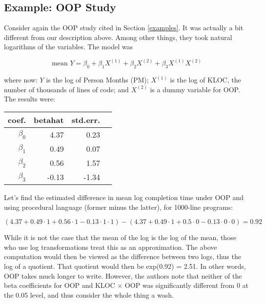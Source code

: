 \subsection{Example:  OOP Study}

Consider again the OOP study cited in Section \ref{examples}.  It was
actually a bit different from our description above.  Among other
things, they took natural logarithms of the variables.  The model was

\begin{equation}
\label{oopmodel}
\textrm{mean } Y =
\beta_0 +
\beta_1 X^{(1)} +
\beta_2 X^{(2)} +
\beta_3 X^{(1)} X^{(2)}
\end{equation}

where now:  $Y$ is the log of Person Months (PM); $X^{(1)}$ is the log of
KLOC, the number of thousands of lines of code; and $ X^{(2)}$ is a dummy
variable for OOP.  The results were:

\begin{tabular}{|r|r|r|r|}
\hline
coef. & betahat & std.err. \\ \hline
$\beta_0$ & 4.37 & 0.23 \\ \hline
$\beta_1$ & 0.49 & 0.07 \\ \hline
$\beta_2$ & 0.56 & 1.57 \\ \hline
$\beta_3$ & -0.13 & -1.34 \\ \hline
\end{tabular}

Let's find the estimated difference in mean log completion time
under OOP and using procedural language  (former minus the latter), for
1000-line programs:

\begin{equation}
(4.37 + 0.49 \cdot 1 + 0.56 \cdot 1 - 0.13 \cdot 1 \cdot 1) -
(4.37 + 0.49 \cdot 1 + 0.5 \cdot 0 - 0.13 \cdot 0 \cdot 0) = 0.92
\end{equation}

While it is not the case that the mean of the log is the log of the
mean, those who use log transformations treat this as an approximation.
The above computation would then be viewed as the difference between two
logs, thus the log of a quotient.  That quotient would then be exp(0.92)
= 2.51.  In other words, OOP takes much longer to write.  However, the
authors note that neither of the beta coefficients for OOP and KLOC
$\times$ OOP was significantly different from 0 at the 0.05 level, and
thus consider the whole thing a wash.

